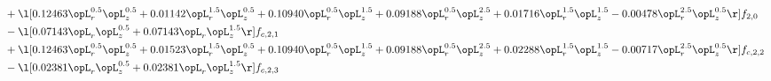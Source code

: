 \begin{alignat}{2}
& + \l[  0.12463 \opL_r^{0.5} \opL_z^{0.5} +  0.01142 \opL_r^{1.5} \opL_z^{0.5} +  0.10940 \opL_r^{0.5} \opL_z^{1.5} +  0.09188 \opL_r^{0.5} \opL_z^{2.5} +  0.01716 \opL_r^{1.5} \opL_z^{1.5}   -0.00478 \opL_r^{2.5} \opL_z^{0.5}  \r] f_{2,0} \nonumber \\ 
& - \l[  0.07143 \opL_r \opL_z^{0.5} +  0.07143 \opL_r \opL_z^{1.5}  \r] f_{c,2,1} \nonumber \\ 
& + \l[  0.12463 \opL_r^{0.5} \opL_z^{0.5} +  0.01523 \opL_r^{1.5} \opL_z^{0.5} +  0.10940 \opL_r^{0.5} \opL_z^{1.5} +  0.09188 \opL_r^{0.5} \opL_z^{2.5} +  0.02288 \opL_r^{1.5} \opL_z^{1.5}   -0.00717 \opL_r^{2.5} \opL_z^{0.5}  \r] f_{c,2,2} \nonumber \\ 
& - \l[  0.02381 \opL_r \opL_z^{0.5} +  0.02381 \opL_r \opL_z^{1.5}  \r] f_{c,2,3} \nonumber \\ 
\end{alignat} 


